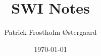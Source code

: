 \documentclass[12pt]{article}
\title{SWI Notes}
\author{Patrick Frostholm Østergaard}
\begin{document}
\date{\today}
\maketitle
\end{document}
